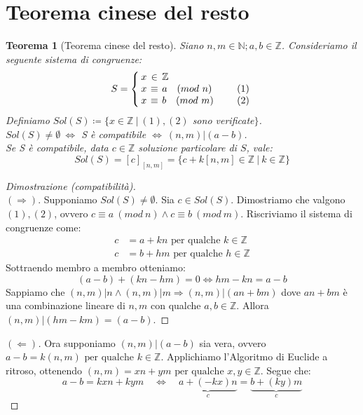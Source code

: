 \documentclass[12pt,twoside]{article}
\newcommand{\N}{\mathbb{N}}
\newcommand{\Z}{\mathbb{Z}}
\newcommand{\sesolose}{\Leftrightarrow}
\newcommand{\implica}{\Longrightarrow}
\newcommand{\pq}{\text{ per qualche }}
\renewcommand\qedsymbol{$\blacksquare$}
\newtheorem{theorem}{Teorema}
\begin{document}
\section{Teorema cinese del resto}
\begin{theorem}[Teorema cinese del resto]
Siano $n, m \in \N; a, b \in \Z$. Consideriamo il seguente sistema di congruenze:
\[
S = \left\{
\setlength\arraycolsep{2pt}
\begin{array}{rclc} x& \in &\Z & \\ x & \equiv &a\quad (mod\ n) &\qquad (1) \\ x & \equiv& b\quad (mod \ m)& \qquad (2) 
\end{array}\right
.
\]
Definiamo $Sol(S) \coloneqq \{ x \in \Z \ |\ (1), (2)$ sono verificate$\}$.
\\ $Sol(S) \ne \emptyset \ \sesolose$ S è compatibile $ \sesolose \ (n,m) | (a-b)$.
\\ Se S è compatibile, data $c \in \Z$ soluzione particolare di $S$, vale:
$$Sol(S) = [c]_{[n,m]} = \{ c + k[n,m] \in \Z \ |\ k \in \Z\}$$
\end{theorem}

\renewcommand\qedsymbol{$\square$}
\begin{proof}[Dimostrazione (compatibilità)]\ \\
$(\implica)$.
Supponiamo $Sol(S) \ne \emptyset$. Sia $c \in Sol(S)$. Dimostriamo che valgono $(1), (2)$, ovvero $c \equiv a\ (mod \ n) \land c \equiv b\ (mod \ m)$. Riscriviamo il sistema di congruenze come:
\begin{align*}c &= a + kn \pq k \in \Z \\
c &= b + hm \pq h \in \Z
\end{align*}
Sottraendo membro a membro otteniamo:
$$ (a-b) + (kn - hm) = 0 \sesolose hm-kn = a-b $$
Sappiamo che $(n, m)|n \land (n,m)|m \implica (n,m)|(an+bm)$ dove $an + bm$ è una combinazione lineare di $n, m$ con qualche $a, b \in \Z$. Allora $(n, m) | (hm - km) = (a - b)$.
\end{proof}

\begin{proof}[$(\Longleftarrow)$]
Ora supponiamo $(n, m) | (a - b)$ sia vera, ovvero $a -b = k(n,m) \pq k \in \Z$. Applichiamo l'Algoritmo di Euclide a ritroso, ottenendo $(n, m) = xn + ym \pq x, y \in \Z$. Segue che:
$$ a - b = kxn + kym \quad\sesolose\quad \underbrace{a + (-kx)n}_c  =  \underbrace{b +(ky)m}_c $$
\end{proof}
\end{document}
